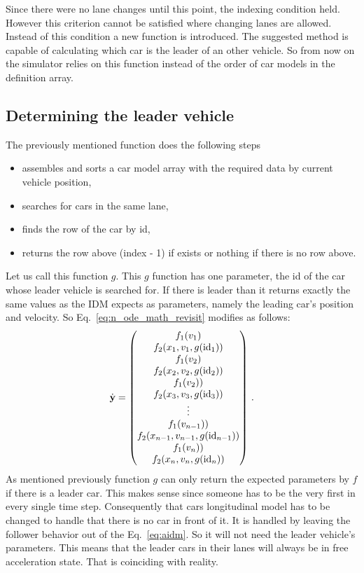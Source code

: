 		Since there were no lane changes until this point, the indexing condition held. However this criterion cannot be satisfied where changing lanes are allowed. Instead of this condition a new function is introduced. The suggested method is capable of calculating which car is the leader of an other vehicle. So from now on the simulator relies on this function instead of the order of car models in the definition array.
		\subsection*{Determining the leader vehicle}
		The previously mentioned function does the following steps
		\begin{itemize}
			\item assembles and sorts a car model array with the required data by current vehicle position,
			\item searches for cars in the same lane,
			\item finds the row of the car by id,
			\item returns the row above (index - 1) if exists or nothing if there is no row above.
		\end{itemize}
		Let us call this function $g$. This $g$ function has one parameter, the id of the car whose leader vehicle is searched for. If there is leader than it returns exactly the same values as the IDM expects as parameters, namely the leading car's position and velocity.
		So Eq.~\eqref{eq:n_ode_math_revisit} modifies as follows:
		\begin{equation}
			\dot{\textbf{y}}=
			\begin{pmatrix}
			f_1(v_1)\\
			f_2(x_{1}, v_{1},g({\rm id}_1))\\
			f_1(v_2)\\
			f_2(x_{2}, v_{2},g({\rm id}_2))\\
			f_1(v_2))\\
			f_2(x_{3}, v_{3},g({\rm id}_3))\\
			\vdots\\
			f_1(v_{n-1}))\\
			f_2(x_{n-1}, v_{n-1},g({\rm id}_{n-1}))\\
			f_1(v_n))\\
			f_2(x_{n}, v_{n},g({\rm id}_{n}))
			\end{pmatrix}\,.
			\label{eq:n_ode_math_with_find_leading}
		\end{equation}
		As mentioned previously function $g$ can only return the expected parameters by $f$ if there is a leader car. This makes sense since someone has to be the very first in every single time step. Consequently that cars longitudinal model has to be changed to handle that there is no car in front of it. It is handled by leaving the follower behavior out of the Eq.~\eqref{eq:aidm}. So it will not need the leader vehicle's parameters. This means that the leader cars in their lanes will always be in free acceleration state. That is coinciding with reality. 
